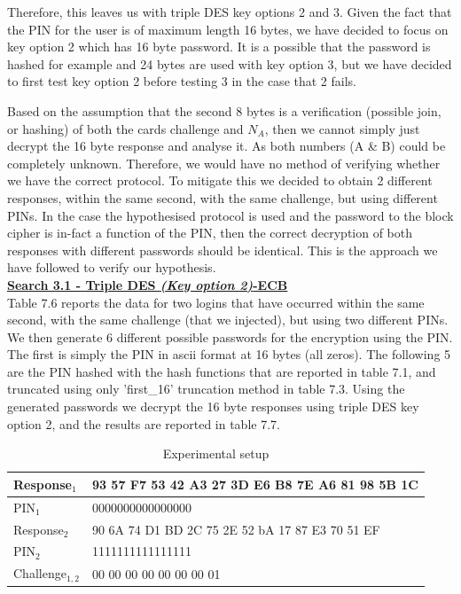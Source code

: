 \documentclass[bsc,frontabs,twoside,singlespacing,parskip,deptreport]{infthesis}     %
\begin{document}
Therefore, this leaves us with triple DES key options 2 and 3. Given the fact that the PIN for the user is of maximum length 16 bytes, we have decided to focus on key option 2 which has 16 byte password. It is a possible that the password is hashed for example and 24 bytes are used with key option 3, but we have decided to first test key option 2 before testing 3 in the case that 2 fails.

Based on the assumption that the second 8 bytes is a verification (possible join, or hashing) of both the cards challenge and $N_A$, then we cannot simply just decrypt the 16 byte response and analyse it. As both numbers (A \& B) could be completely unknown. Therefore, we would have no method of verifying whether we have the correct protocol. To mitigate this we decided to obtain 2 different responses, within the same second, with the same challenge, but using different PINs. In the case the hypothesised protocol is used and the password to the block cipher is in-fact a function of the PIN, then the correct decryption of both responses with different passwords should be identical. This is the approach we have followed to verify our hypothesis.\\

\textbf{\underline{Search 3.1 - Triple DES \textit{(Key option 2)}-ECB}}\\
Table 7.6 reports the data for two logins that have occurred within the same second, with the same challenge (that we injected), but using two different PINs. We then generate 6 different possible passwords for the encryption using the PIN. The first is simply the PIN in ascii format at 16 bytes (all zeros). The following 5 are the PIN hashed with the hash functions that are reported in table 7.1, and truncated using only 'first\_16' truncation method in table 7.3. Using the generated passwords we decrypt the 16 byte responses using triple DES key option 2, and the results are reported in table 7.7.

\begin{table}[H]
\begin{tabular}{|l|l|}
\hline
Response$_1$ & 93 57 F7 53 42 A3 27 3D E6 B8 7E A6 81 98 5B 1C\\
\hline
PIN$_1$ & 0000000000000000\\
\hline
Response$_2$ & 90 6A 74 D1 BD 2C 75 2E 52 bA 17 87 E3 70 51 EF\\
\hline
PIN$_2$ & 1111111111111111\\
\hline
Challenge$_{1,2}$ & 00 00 00 00 00 00 00 01\\
\hline
\end{tabular}
\caption{Experimental setup}
\end{table}
\end{document}
